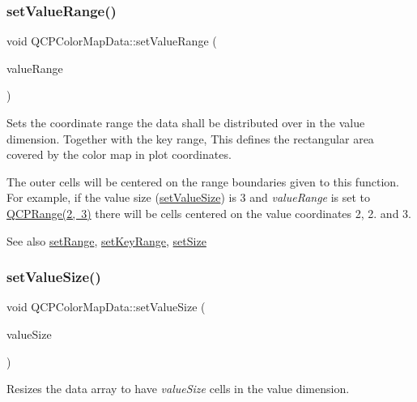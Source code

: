 \subsubsection{\texorpdfstring{set\+Value\+Range()}{setValueRange()}}
{\footnotesize\ttfamily void Q\+C\+P\+Color\+Map\+Data\+::set\+Value\+Range (\begin{DoxyParamCaption}\item[{const \mbox{\hyperlink{class_q_c_p_range}{Q\+C\+P\+Range}} \&}]{value\+Range }\end{DoxyParamCaption})}

Sets the coordinate range the data shall be distributed over in the value dimension. Together with the key range, This defines the rectangular area covered by the color map in plot coordinates.

The outer cells will be centered on the range boundaries given to this function. For example, if the value size (\mbox{\hyperlink{class_q_c_p_color_map_data_a0893c9e3914513048b45e3429ffd16f2}{set\+Value\+Size}}) is 3 and {\itshape value\+Range} is set to {\ttfamily \mbox{\hyperlink{class_q_c_p_range}{Q\+C\+P\+Range(2, 3)}}} there will be cells centered on the value coordinates 2, 2. and 3.

\begin{DoxySeeAlso}{See also}
\mbox{\hyperlink{class_q_c_p_color_map_data_aad9c1c7c703c1339489fc730517c83d4}{set\+Range}}, \mbox{\hyperlink{class_q_c_p_color_map_data_a0738c485f3c9df9ea1241b7a8bb6a86e}{set\+Key\+Range}}, \mbox{\hyperlink{class_q_c_p_color_map_data_a0d9ff35c299d0478b682bfbcdd9c097e}{set\+Size}} 
\end{DoxySeeAlso}
\mbox{\label{class_q_c_p_color_map_data_a0893c9e3914513048b45e3429ffd16f2}} 
\subsubsection{\texorpdfstring{set\+Value\+Size()}{setValueSize()}}
{\footnotesize\ttfamily void Q\+C\+P\+Color\+Map\+Data\+::set\+Value\+Size (\begin{DoxyParamCaption}\item[{int}]{value\+Size }\end{DoxyParamCaption})}

Resizes the data array to have {\itshape value\+Size} cells in the value dimension.

